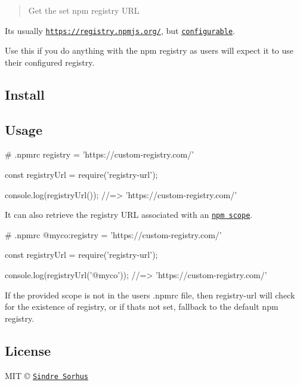\begin{quote}
Get the set npm registry U\+RL \end{quote}


It\textquotesingle{}s usually {\ttfamily \href{https://registry.npmjs.org/}{\tt https\+://registry.\+npmjs.\+org/}}, but \href{https://www.npmjs.org/doc/misc/npm-config.html#registry}{\tt configurable}.

Use this if you do anything with the npm registry as users will expect it to use their configured registry.

\subsection*{Install}




\subsection*{Usage}


\begin{DoxyCode}
# .npmrc
registry = 'https://custom-registry.com/'
\end{DoxyCode}



\begin{DoxyCode}
const registryUrl = require('registry-url');

console.log(registryUrl());
//=> 'https://custom-registry.com/'
\end{DoxyCode}


It can also retrieve the registry U\+RL associated with an \href{https://docs.npmjs.com/misc/scope}{\tt npm scope}.


\begin{DoxyCode}
# .npmrc
@myco:registry = 'https://custom-registry.com/'
\end{DoxyCode}



\begin{DoxyCode}
const registryUrl = require('registry-url');

console.log(registryUrl('@myco'));
//=> 'https://custom-registry.com/'
\end{DoxyCode}


If the provided scope is not in the user\textquotesingle{}s {\ttfamily .npmrc} file, then {\ttfamily registry-\/url} will check for the existence of {\ttfamily registry}, or if that\textquotesingle{}s not set, fallback to the default npm registry.

\subsection*{License}

M\+IT © \href{http://sindresorhus.com}{\tt Sindre Sorhus} 